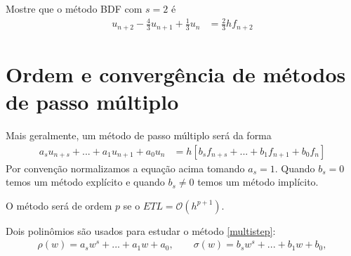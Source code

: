 \begin{exer}
Mostre que o método BDF com $s=2$ é
\begin{eqnarray}
  u_{n+2} -\frac{4}{3} u_{n+1} + \frac{1}{3}u_n &= \frac{2}{3}h f_{n+2}
\end{eqnarray}
\end{exer}


\section{Ordem e convergência de métodos de passo múltiplo}
Mais geralmente, um método de passo múltiplo será da forma
\begin{eqnarray}\label{multistep}
  a_s u_{n+s}+ ...+ a_1 u_{n+1} + a_0u_{n} &=  h [b_sf_{n+s} +... +b_1f_{n+1} +b_0f_n]
\end{eqnarray}
Por convenção normalizamos a equação acima tomando $a_s=1$. Quando $b_s=0$ temos um método explícito e quando $b_s \neq 0$ temos um método implícito.

O método será de ordem $p$ se o $ETL=\mathcal O(h^{p+1})$.


Dois polinômios são usados para estudar o método \eqref{multistep}:
\begin{eqnarray}
\rho (w)= a_s w^s + ...+a_1w+a_0, \quad \quad \sigma (w)=b_s w^s + ...+b_1w+b_0,
\end{eqnarray}



